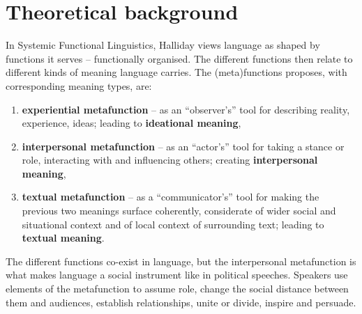 \documentclass[11pt]{article}
\begin{document}
\section{Theoretical background}{
	In Systemic Functional Linguistics, Halliday views language as shaped by functions it serves -- functionally organised. The different functions then relate to different kinds of meaning language carries.
	The (meta)functions \citet{Halliday1970IM} proposes, with corresponding meaning types, are:
	\begin{enumerate}
		\item \textbf{experiential metafunction} -- as an ``observer's'' tool for describing reality, experience, ideas; leading to \textbf{ideational meaning},
		\item \textbf{interpersonal metafunction} -- as an ``actor's'' tool for taking a stance or role, interacting with and influencing others; creating \textbf{interpersonal meaning},
		\item \textbf{textual metafunction} -- as a ``communicator's'' tool for making the previous two meanings surface coherently, considerate of wider social and situational context and of local context of surrounding text; leading to \textbf{textual meaning}.
	\end{enumerate}
	The different functions co-exist in language, but the interpersonal metafunction is what makes language a social instrument like in political speeches. Speakers use elements of the metafunction to assume role, change the social distance between them and audiences, establish relationships, unite or divide, inspire and persuade.
}
\end{document}
